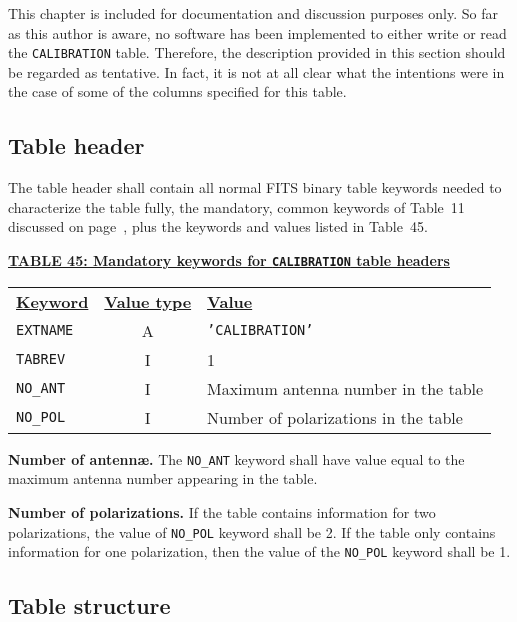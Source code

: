 \documentclass[twoside]{article}
\newcommand{\Me}[1]{\textcolor{mecol}{#1}}
\begin{document}
\Me{This chapter is included for documentation and discussion purposes
  only.  So far as this author is aware, no software has been
  implemented to either write or read the {\tt CALIBRATION} table.}
Therefore, the description provided in this section should be regarded
as tentative.  In fact, it is not at all clear what the intentions
were in the case of some of the columns specified for this table.

\subsection{Table header}

The table header shall contain all normal FITS binary table keywords
needed to characterize the table fully, the mandatory, common keywords
of Table~11 discussed on page~\pageref{ta:keywords}, plus the keywords
and values listed in Table~45.

\begin{center}
\underline{\bf{TABLE 45: Mandatory keywords for {\tt CALIBRATION}
    table headers}}\\
\begin{tabular}{lcl}
\noalign{\vspace{2pt}}
\underline{{\bf Keyword}} & \underline{\bf{Value type}} &
    \underline{\bf{Value\vphantom{y}}} \\
\noalign{\vspace{2pt}}
{\tt EXTNAME}   & A & {\tt 'CALIBRATION'}  \\
{\tt TABREV}    & I & 1 \\
{\tt NO\_ANT}   & I & Maximum antenna number in the table \\
{\tt NO\_POL}   & I & Number of polarizations in the table \\
\end{tabular}
\end{center}

{\bf Number of antenn\ae.}  The {\tt NO\_ANT} keyword shall have value
equal to the maximum antenna number appearing in the table.

{\bf Number of polarizations.}  If the table contains information for
two polarizations, the value of {\tt NO\_POL} keyword shall be 2.  If
the table only contains information for one polarization, then the
value of the {\tt NO\_POL} keyword shall be 1.

\subsection{Table structure}
\end{document}
